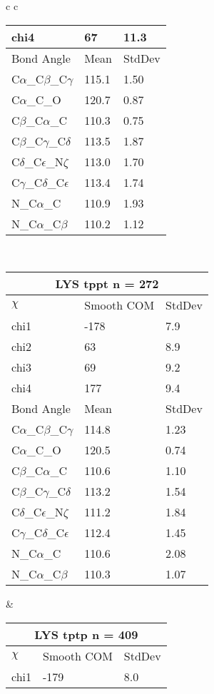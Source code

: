 \begin{longtable}{ c c }
\begin{tabular}{ l l l }
  chi4 & 67 & 11.3 \\ \midrule
  Bond Angle   & Mean     & StdDev \\ \midrule
  C$\alpha$\_C$\beta$\_C$\gamma$ & 115.1 & 1.50\\
  C$\alpha$\_C\_O & 120.7 & 0.87\\
  C$\beta$\_C$\alpha$\_C & 110.3 & 0.75\\
  C$\beta$\_C$\gamma$\_C$\delta$ & 113.5 & 1.87\\
  C$\delta$\_C$\epsilon$\_N$\zeta$ & 113.0 & 1.70\\
  C$\gamma$\_C$\delta$\_C$\epsilon$ & 113.4 & 1.74\\
  N\_C$\alpha$\_C & 110.9 & 1.93\\
  N\_C$\alpha$\_C$\beta$ & 110.2 & 1.12\\
  \bottomrule
  \end{tabular}
  \\
  \begin{tabular}{ l l l }
  \toprule
  \multicolumn{3}{c}{LYS \textbf{tppt} n = 272} \\ \toprule
  $\chi$       & Smooth COM & StdDev \\ \midrule
  chi1 & -178 & 7.9 \\ 
  chi2 & 63 & 8.9 \\ 
  chi3 & 69 & 9.2 \\ 
  chi4 & 177 & 9.4 \\ \midrule
  Bond Angle   & Mean     & StdDev \\ \midrule
  C$\alpha$\_C$\beta$\_C$\gamma$ & 114.8 & 1.23\\
  C$\alpha$\_C\_O & 120.5 & 0.74\\
  C$\beta$\_C$\alpha$\_C & 110.6 & 1.10\\
  C$\beta$\_C$\gamma$\_C$\delta$ & 113.2 & 1.54\\
  C$\delta$\_C$\epsilon$\_N$\zeta$ & 111.2 & 1.84\\
  C$\gamma$\_C$\delta$\_C$\epsilon$ & 112.4 & 1.45\\
  N\_C$\alpha$\_C & 110.6 & 2.08\\
  N\_C$\alpha$\_C$\beta$ & 110.3 & 1.07\\
  \bottomrule
  \end{tabular}
  &
  \begin{tabular}{ l l l }
  \toprule
  \multicolumn{3}{c}{LYS \textbf{tptp} n = 409} \\ \toprule
  $\chi$       & Smooth COM & StdDev \\ \midrule
  chi1 & -179 & 8.0 \\ 

\end{tabular}
\end{longtable}
